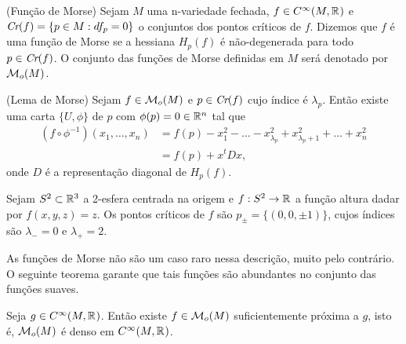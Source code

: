 \documentclass{beamer}
\begin{document}
\begin{frame}
	\begin{definicao}
		(Função de Morse) Sejam $M$ uma n-variedade fechada, $f \in C^{\infty}(M, \mathbb{R}^{})$ e $\textit{Cr}(f) = \{p \in M: df_{p} = 0\}$ o conjuntos dos pontos críticos de $f$. Dizemos que $f$ é uma função de Morse se a hessiana $H_{p}(f)$ é não-degenerada para todo $p \in \textit{Cr}(f)$. O conjunto das funções de Morse definidas em $M$ será denotado por $\mathcal{M}_{o}(M)$. 
	\end{definicao}
	\begin{lema}
		(Lema de Morse) Sejam $f \in \mathcal{M}_{o}(M)$ e $p \in \textit{Cr}(f)$ cujo índice é $\lambda_{p}$. Então existe uma carta $\{U, \phi\}$ de $p$ com $\phi(p)=0 \in \mathbb{R}^{n}$ tal que 
		$$
		\begin{aligned}
		(f\circ \phi^{-1})(x_{1}, \dots, x_{n}) &= f(p)-x_{1}^{2}-\dots -x^{2}_{\lambda_{p}}+x^{2}_{\lambda_{p}+1}+\dots + x^{2}_{n}
		\\
		&=f(p)+x^{t}Dx,
		\end{aligned}
		$$
		onde $D$ é a representação diagonal de $H_{p}(f)$.
	\end{lema}
\end{frame}

\begin{frame}
	\begin{exemplo}
		Sejam $S^{2} \subset \mathbb{R}^{3}$ a 2-esfera centrada na origem e $f:S^{2}\to \mathbb{R}^{}$ a função altura dadar por $f(x,y,z) = z$. Os pontos críticos de $f$ são $p_{\pm} = \{(0,0,\pm 1)\}$, cujos índices são $\lambda_{- } = 0$ e $\lambda_{+ } = 2$.
	\end{exemplo}
	
	As funções de Morse não são um caso raro nessa descrição, muito pelo contrário. O seguinte teorema garante que tais funções são abundantes no conjunto das funções suaves.
	\begin{teorema}
		Seja $g\in C^{\infty}(M, \mathbb{R}^{})$. Então existe $f \in \mathcal{M}_{o}(M)$ suficientemente próxima a $g$, isto é, $\mathcal{M}_{o}(M)$ é denso em $C^{\infty}(M, \mathbb{R}^{})$.
	\end{teorema}
\end{frame}
	
\end{document}
